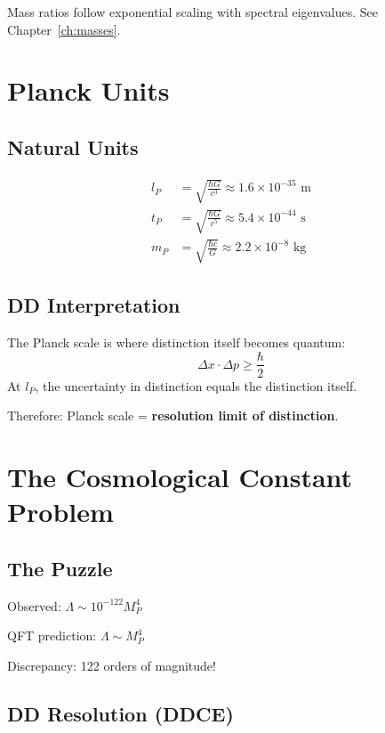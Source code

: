 Mass ratios follow exponential scaling with spectral eigenvalues. See Chapter~\ref{ch:masses}.

\section{Planck Units}

\subsection{Natural Units}

\begin{align}
l_P &= \sqrt{\frac{\hbar G}{c^3}} \approx 1.6 \times 10^{-35} \text{ m} \\
t_P &= \sqrt{\frac{\hbar G}{c^5}} \approx 5.4 \times 10^{-44} \text{ s} \\
m_P &= \sqrt{\frac{\hbar c}{G}} \approx 2.2 \times 10^{-8} \text{ kg}
\end{align}

\subsection{DD Interpretation}

\begin{theorem}
The Planck scale is where distinction itself becomes quantum:
\begin{equation}
\Delta x \cdot \Delta p \geq \frac{\hbar}{2}
\end{equation}
At $l_P$, the uncertainty in distinction equals the distinction itself.
\end{theorem}

Therefore: Planck scale = \textbf{resolution limit of distinction}.

\section{The Cosmological Constant Problem}

\subsection{The Puzzle}

Observed: $\Lambda \sim 10^{-122} M_P^4$

QFT prediction: $\Lambda \sim M_P^4$

Discrepancy: 122 orders of magnitude!

\subsection{DD Resolution (DDCE)}

